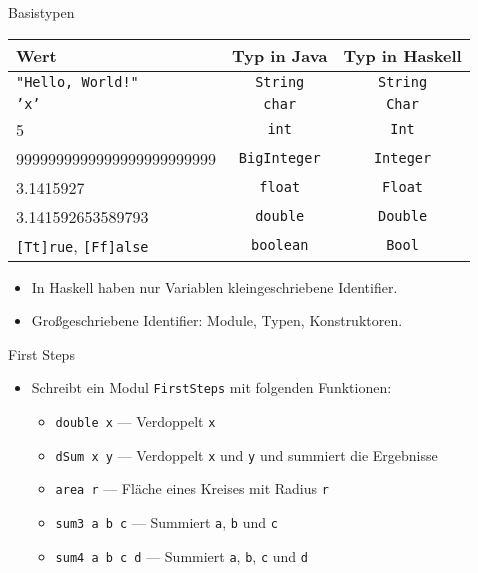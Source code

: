 \documentclass{beamer}
\begin{document}
\begin{frame}{Basistypen}
        \begin{tabular}{ l | c | c }
                Wert & Typ in Java & Typ in Haskell \\
                \hline
                \texttt{"Hello, World!"} & \texttt{String} & \pause \texttt{String} \\
                \texttt{'x'} & \texttt{char} & \pause \texttt{Char} \\
                5 & \texttt{int} & \pause \texttt{Int} \\
                9999999999999999999999999 & \texttt{BigInteger} & \pause \texttt{Integer} \\
                3.1415927 & \texttt{float} & \pause \texttt{Float} \\
                3.141592653589793 & \texttt{double} & \pause \texttt{Double} \\
                \texttt{[Tt]rue}, \texttt{[Ff]alse} & \texttt{boolean} & \pause \texttt{Bool} \\
        \end{tabular}

        \begin{itemize}
                \item In Haskell haben nur Variablen kleingeschriebene Identifier.
                \item Großgeschriebene Identifier: Module, Typen, Konstruktoren.
        \end{itemize}
\end{frame}

\begin{frame}{First Steps}

        \begin{itemize}
                \item Schreibt ein Modul \texttt{FirstSteps} mit folgenden Funktionen:
                \begin{itemize}
                        \item \texttt{double x} --- Verdoppelt \texttt{x}
                        \item \texttt{dSum x y} --- Verdoppelt \texttt{x} und \texttt{y} und summiert die Ergebnisse
                        \item \texttt{area r} --- Fläche eines Kreises mit Radius \texttt{r}
                        \item \texttt{sum3 a b c} --- Summiert \texttt{a}, \texttt{b} und \texttt{c}
                        \item \texttt{sum4 a b c d} --- Summiert \texttt{a}, \texttt{b}, \texttt{c} und \texttt{d}
                \end{itemize}
        \end{itemize}
\end{frame}
\end{document}
